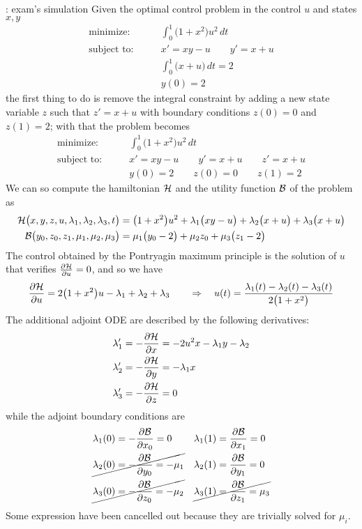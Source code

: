 \begin{example}{: exam's simulation}
	Given the optimal control problem in the control $u$ and states $x,y$
	\begin{align*}
		\textrm{minimize:} \qquad & \int_0^1 \big(1+x^2\big) u^2 \, dt  \\
		\textrm{subject to:} \qquad & x' = xy - u \qquad y' = x + u \\
		& \int_0^1\big(x+u\big) \,dt = 2 \\
		& y(0) = 2
	\end{align*}
	the first thing to do is remove the integral constraint by adding a new state variable $z$ such that $z' = x+u$ with boundary conditions $z(0) = 0$ and $z(1) =2$; with that the problem becomes
	\begin{align*}
		\textrm{minimize:} \qquad & \int_0^1 \big(1+x^2\big) u^2 \, dt  \\
		\textrm{subject to:} \qquad & x' = xy - u \qquad y' = x + u \qquad z' = x+u \\
		& y(0) = 2 \qquad z(0) = 0 \qquad z(1) = 2
	\end{align*}
	We can so compute the hamiltonian $\mathcal{H}$ and the utility function $\mathcal{B}$ of the problem as
	\begin{align*}
		\mathcal{H}\big(x,y,z,u,\lambda_1,\lambda_2,\lambda_3,t\big) & = \big(1+x^2\big)u^2 + \lambda_1\big(xy -u\big) + \lambda_2 \big(x+u\big) + \lambda_3 \big(x+u\big) \\
		\mathcal{B}\big(y_0,z_0,z_1, \mu_1, \mu_2,\mu_3\big) & = \mu_1\big(y_0-2\big) + \mu_2 z_0 + \mu_3\big(z_1-2\big)
	\end{align*}
	The control obtained by the Pontryagin maximum principle is the solution of $u$ that verifies $\frac{\partial \mathcal{H}}{\partial u} = 0$, and so we have
	\[ \frac{\partial \mathcal{H}}{\partial u} = 2\big(1+x^2\big)u -\lambda_1 + \lambda_2 +\lambda_3 \qquad \Rightarrow \quad u(t) = \frac{\lambda_1(t) - \lambda_2(t) - \lambda_3(t)}{2\big(1+x^2\big)} \]
	The additional adjoint ODE are described by the following derivatives:
	\begin{align*}
		\lambda_1' & = -\frac{\partial \mathcal{H}}{\partial x} = -2u^2x - \lambda_1 y - \lambda_2 \\
		\lambda_2' & = -\frac{\partial \mathcal{H}}{\partial y} = - \lambda_1 x \\
		\lambda_3' & = -\frac{\partial \mathcal{H}}{\partial z} = 0
	\end{align*}	
	while the adjoint boundary conditions are
	\begin{align*}
		&\lambda_1(0)  = - \frac{\partial \mathcal{B}}{\partial x_0} = 0   && \lambda_1(1) = \frac{\partial \mathcal{B}}{\partial x_1} = 0 \\
		&\cancel{\lambda_2(0)  = - \frac{\partial \mathcal{B}}{\partial y_0} = -\mu_1}   && \lambda_2(1) = \frac{\partial \mathcal{B}}{\partial y_1} = 0 \\
		&\cancel{\lambda_3(0)  = - \frac{\partial \mathcal{B}}{\partial z_0} = -\mu_2}   && \cancel{\lambda_3(1)  = \frac{\partial \mathcal{B}}{\partial z_1} = \mu_3} 
	\end{align*}
	Some expression have been cancelled out because they are trivially solved for $\mu_i$.
\end{example}



















